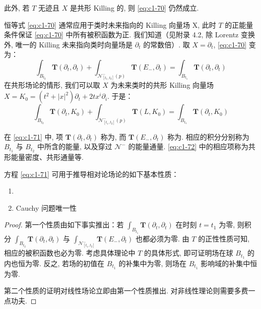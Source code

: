 此外, 若 $T$ 无迹且 $X$ 是共形 Killing 的, 则 \eqref{eq:c1-70} 仍然成立. 

恒等式 \eqref{eq:c1-70} 通常应用于类时未来指向的 Killing 向量场 X, 此时 $T$ 的正能量条件保证 \eqref{eq:c1-70} 中所有被积函数为正. 我们知道（见附录 4.2, 除 Lorentz 变换外, 唯一的 Killing 未来指向类时向量场是 $\partial_t$ 的常数倍）. 取 $X = \partial_t$, \eqref{eq:c1-70} 变为：
\begin{equation}
\int_{B_{t_2}}\mathbf{T}(\partial_t, \partial_t) + \int_{\mathcal{N}^-_{[t_1, t_2]}(p)}\mathbf{T}(E_-, \partial_t) = \int_{B_{t_1}}\mathbf{T}(\partial_t, \partial_t)\label{eq:c1-71}
\end{equation}
在共形场论的情形, 我们可以取 $X$ 为未来类时的共形 Killing 向量场 $X = K_0 = (t^2+|x|^2)\partial_t + 2tx^i\partial_i$. 于是：
\begin{equation}
\int_{B_{t_2}}\mathbf{T}(\partial_t, K_0) + \int_{\mathcal{N}^-_{[t_1, t_2]}(p)}\mathbf{T}(L, K_0) = \int_{B_{t_1}}\mathbf{T}(\partial_t, K_0)\label{eq:c1-72}
\end{equation}

在 \eqref{eq:c1-71} 中, 项 $\mathbf{T}(\partial_t, \partial_t)$ 称为, 而 $\mathbf{T}(E_-, \partial_t)$ 称为. 相应的积分分别称为 $B_{t_1}$ 与 $B_{t_2}$ 中所含的能量, 以及穿过 $\mathcal{N}^-$ 的能量通量. \eqref{eq:c1-72} 中的相应项称为共形能量密度、共形通量等. 

方程 \eqref{eq:c1-71} 可用于推导相对论场论的如下基本性质：
\begin{enumerate}
\item {}
\item Cauchy 问题唯一性
\end{enumerate}

\begin{proof}
第一个性质由如下事实推出：若 $\int_{B_{t_1}}\mathbf{T}(\partial_t, \partial_t)$ 在时刻 $t = t_1$ 为零, 则积分 $\int_{B_{t_2}}\mathbf{T}(\partial_t, \partial_t)$ 与 $\int_{\mathcal{N}^-_{[t_1, t_2]}}\mathbf{T}(E_-, \partial_t)$ 也都必须为零. 由 $T$ 的正性性质可知, 相应的被积函数也必为零. 考虑具体理论中 $T$ 的具体形式, 即可证明场在球 $B_{t_1}$ 的内也恒为零. 反之, 若场的初值在 $B_{t_1}$ 的补集中为零, 则场在 $B_{t_1}$ 影响域的补集中恒为零. 

第二个性质的证明对线性场论立即由第一个性质推出. 对非线性理论则需要多费一点功夫. 
\end{proof}

